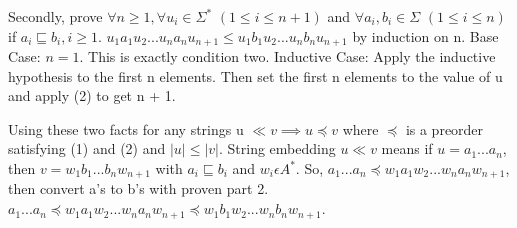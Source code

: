 \documentclass[12pt]{article}
\begin{document}
\medskip

Secondly, prove
$ \forall n \ge 1, \forall u_i \in \Sigma^\ast$ $(1 \le i \le n+1)$
and $\forall a_i,b_i \in \Sigma$ $(1 \le i \le n)$ 
if $a_i \sqsubseteq b_i, i \ge 1$.
\newline
$u_1a_1u_2...u_na_nu_{n+1} \le u_1b_1u_2...u_nb_nu_{n+1}$ by induction on n.
\newline
Base Case: $n=1$. This is exactly condition two. 
\newline 
Inductive Case: Apply the inductive hypothesis to the 
first n elements. Then set the first n elements to the value of u and
apply (2) to get n + 1.
\medskip

Using these two facts for any strings u $\ll v \implies u \preceq v$
where $\preceq$ is a preorder satisfying (1) and 
(2) and $|u| \le |v|$. String embedding $u \ll v$ means
if $u=a_1 ...a_n$, then $v=w_1 b_1 ... b_n w_{n+1}$
with $a_i \sqsubseteq b_i$ and $w_i \epsilon A^{\ast}$.
So, $a_1 ... a_n  \preceq w_1 a_1 w_2 ... w_n a_n w_{n+1}$, then convert
a's to b's with proven part 2.
$a_1 ... a_n  \preceq w_1 a_1 w_2 ... w_n a_n w_{n+1}
\preceq w_1 b_1 w_2 ... w_n b_n w_{n+1}$.
\end{document}
